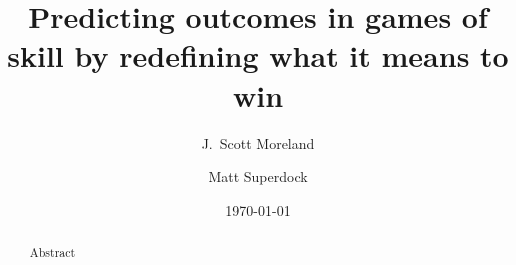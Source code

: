 \documentclass[aps,prc,reprint,amsmath]{revtex4-1}
\begin{document}
\title{Predicting outcomes in games of skill by redefining what it means to win}

\author{J.\ Scott Moreland}
\author{Matt Superdock}

\date{\today}


\begin{abstract}
  Abstract
\end{abstract}


\maketitle
\end{document}
